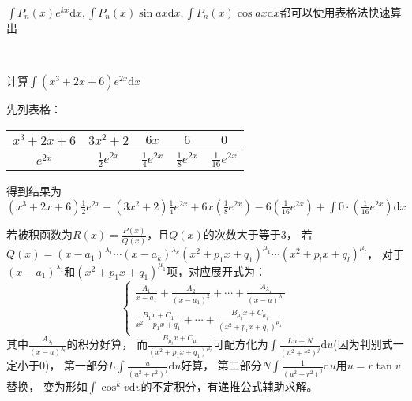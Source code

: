 \begin{note}
  $\int P_n(x) e^{kx}\mathrm{d} x, \int P_n(x) \sin ax \mathrm{d} x, \int P_n(x) \cos ax \mathrm{d} x$都可以使用表格法快速算出
\end{note}

~

\begin{exercise}[$P_n(x)e^{kx}$型]
  计算$\int(x^3 + 2x + 6)e^{2x}\mathrm{d} x$
\end{exercise}

\begin{solution}
  先列表格：
  \begin{center}
    \begin{tabular}[htp]{|c|c|c|c|c|}
      \hline
      $x^3+2x+6$& $3x^2 + 2$& $6x$&$6$&$0$\\
      \hline
      $e^{2x}$&$\frac{1}{2}e^{2x}$&$\frac{1}{4}e^{2x}$&$\frac{1}{8}e^{2x}$&$\frac{1}{16}e^{2x}$\\
      \hline
    \end{tabular}
  \end{center}
  得到结果为$(x^3 + 2x + 6)\frac{1}{2}e^{2x} - (3x^2 + 2)\frac{1}{4}e^{2x} + 6x(\frac{1}{8}e^{2x}) - 6 (\frac{1}{16}e^{2x}) + \int 0 \cdot (\frac{1}{16}e^{2x}) \mathrm{d} x$
\end{solution}


\begin{theorem}[积分有理分解]
  若被积函数为$R(x) = \frac{P(x)}{Q(x)}$，且$Q(x)$的次数大于等于$3$，
  若$Q(x) = (x - a_1)^{\lambda_1}\cdots (x - a_k)^{\lambda_k}(x^2 + p_1x + q_1)^{\mu_1}\cdots (x^2 + p_lx + q_l)^{\mu_l}$，
  对于$(x - a_1)^{\lambda_1}$和$(x^2 + p_1x + q_1)^{\mu_1}$项，对应展开式为：
  \begin{equation*}
    \begin{cases}
      \frac{A_1}{x - a_1} + \frac{A_2}{(x - a_1)^2} + \cdots + \frac{A_{\lambda_1}}{(x - a)^{\lambda_1}}\\
      \frac{B_1x + C_1}{x^2 + p_1x + q_1} + \cdots + \frac{B_{\mu_1}x + C_{\mu_1}}{(x^2 + p_1x + q_1)^{\mu_1}}
    \end{cases}
  \end{equation*}
  其中$\frac{A_{\lambda_l}}{(x - a)^{\lambda_l}}$的积分好算，
  而$\frac{B_{\mu_l}x + C_{\mu_l}}{(x^2 + p_1x + q_1)^{\mu_l}}$可配方化为$\int \frac{Lu + N}{(u^2 + r^2)^j}\mathrm{d} u$(因为判别式一定小于$0$)，
  第一部分$L \int \frac{u}{(u^2 + r^2)^j}\mathrm{d} u$好算，
  第二部分$N \int \frac{1}{(u^2 + r^2)^j}\mathrm{d} u$用$u = r \tan v$替换，
  变为形如$\int \cos^k v \mathrm{d} v$的不定积分，有递推公式辅助求解。
\end{theorem}

